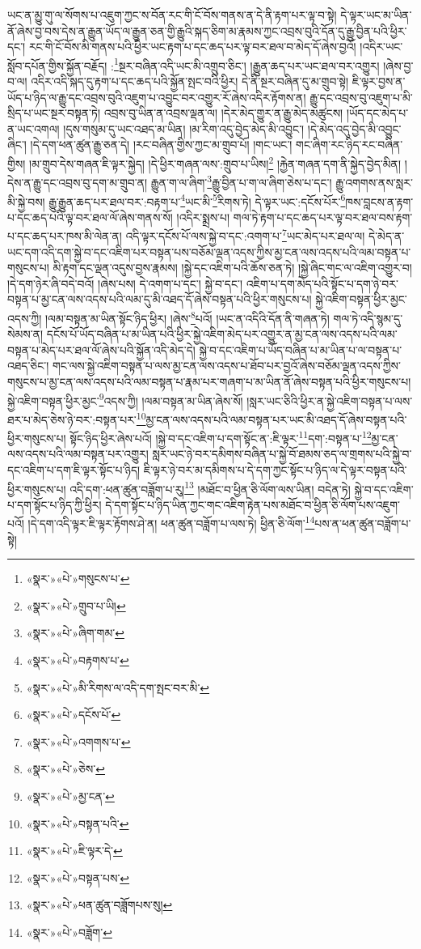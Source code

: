 ཡང་ན་མྱུ་གུ་ལ་སོགས་པ་འཇུག་ཀྱང་ས་བོན་རང་གི་ངོ་བོས་གནས་ན་དེ་ནི་རྟག་པར་ལྟ་བ་སྟེ། དེ་ལྟར་ཡང་མ་ཡིན་ནོ་ཞེས་བྱ་བས་དེས་ན་རྒྱུན་ཡོད་ལ་རྒྱུན་ཅན་གྱི་རྒྱུའི་སྐད་ཅིག་མ་རྣམས་ཀྱང་འབྲས་བུའི་དོན་དུ་རྒྱུ་བྱིན་པའི་ཕྱིར་དང་། རང་གི་ངོ་བོས་མི་གནས་པའི་ཕྱིར་ཡང་རྟག་པ་དང་ཆད་པར་ལྟ་བར་ཐལ་བ་མེད་དོ་ཞེས་བྱའོ། །འདིར་ཡང་སློབ་དཔོན་གྱིས་སྐྱོན་བརྗོད། :\footnote{«སྣར་»«པེ་»གསུངས་པ་}སྔར་བཞིན་འདི་ཡང་མི་འགྲུབ་ཅིང་། །རྒྱུན་ཆད་པར་ཡང་ཐལ་བར་འགྱུར། །ཞེས་བྱ་བ་ལ། འདིར་འདི་སྐད་དུ་རྟག་པ་དང་ཆད་པའི་སྐྱོན་སྤང་བའི་ཕྱིར། དེ་ནི་སྔར་བཞིན་དུ་མ་གྲུབ་སྟེ། ཇི་ལྟར་བྱས་ན་ཡོད་པ་ཉིད་ལ་རྒྱུ་དང་འབྲས་བུའི་འཇུག་པ་འབྱུང་བར་འགྱུར་རོ་ཞེས་འདིར་རྟོགས་ན། རྒྱུ་དང་འབྲས་བུ་འཇུག་པ་མི་སྲིད་པ་ཡང་སྔར་བསྟན་ཏེ། འབྲས་བུ་ཡིན་ན་འབྲས་ལྡན་ལ། །དེར་མེད་གྱུར་ན་རྒྱུ་མེད་མཚུངས། །ཡོད་དང་མེད་པ་ན་ཡང་འགལ། །དུས་གསུམ་དུ་ཡང་འཐད་མ་ཡིན། །མ་རིག་འདུ་བྱེད་མེད་མི་འབྱུང་། །དེ་མེད་འདུ་བྱེད་མི་འབྱུང་ཞིང་། །དེ་དག་ཕན་ཚུན་རྒྱུ་ཅན་དེ། །རང་བཞིན་གྱིས་ཀྱང་མ་གྲུབ་པོ། །གང་ཡང་། གང་ཞིག་རང་ཉིད་རང་བཞིན་གྱིས། །མ་གྲུབ་དེས་གཞན་ཇི་ལྟར་སྐྱེད། །དེ་ཕྱིར་གཞན་ལས་:གྲུབ་པ་ཡིས།\footnote{«སྣར་»«པེ་»གྲུབ་པ་ཡི།} །རྐྱེན་གཞན་དག་ནི་སྐྱེད་བྱེད་མིན། །དེས་ན་རྒྱུ་དང་འབྲས་བུ་དག་མ་གྲུབ་ན། རྒྱུན་ག་ལ་ཞིག་\footnote{«སྣར་»«པེ་»ཞིག་གམ་}རྒྱུ་བྱིན་པ་ག་ལ་ཞིག་ཅེས་པ་དང་། རྒྱུ་འགགས་ནས་སླར་མི་སྐྱེ་བས། རྒྱུ་རྒྱུན་ཆད་པར་ཐལ་བར་:བརྟག་པ་\footnote{«སྣར་»«པེ་»བརྟགས་པ་}ཡང་མི་\footnote{«སྣར་»«པེ་»མི་རིགས་ལ་འདི་དག་སྤང་བར་མི་}རིགས་ཏེ། དེ་ལྟར་ཡང་:དངོས་པོར་\footnote{«སྣར་»«པེ་»དངོས་པོ་}ཁས་བླངས་ན་རྟག་པ་དང་ཆད་པའི་ལྟ་བར་ཐལ་ལོ་ཞེས་གནས་སོ། །འདིར་སྨྲས་པ། གལ་ཏེ་རྟག་པ་དང་ཆད་པར་ལྟ་བར་ཐལ་བས་རྟག་པ་དང་ཆད་པར་ཁས་མི་ལེན་ན། འདི་ལྟར་དངོས་པོ་ལས་སྐྱེ་བ་དང་:འགག་པ་\footnote{«སྣར་»«པེ་»འགགས་པ་}ཡང་མེད་པར་ཐལ་ལ། དེ་མེད་ན་ཡང་དག་འདི་དག་སྐྱེ་བ་དང་འཇིག་པར་བསྟན་པས་བཅོམ་ལྡན་འདས་ཀྱིས་མྱ་ངན་ལས་འདས་པའི་ལམ་བསྟན་པ་གསུངས་པ། མི་རྟག་དང་ལྡན་འདུས་བྱས་རྣམས། །སྐྱེ་དང་འཇིག་པའི་ཆོས་ཅན་ཏེ། །སྐྱེ་ཞིང་གང་ལ་འཇིག་འགྱུར་བ། །དེ་དག་ཉེར་ཞི་བདེ་བའོ། །ཞེས་པས། དེ་འགག་པ་དང་། སྐྱེ་བ་དང་། འཇིག་པ་དག་མེད་པའི་སྟོང་པ་དག་ཉེ་བར་བསྟན་པ་མྱ་ངན་ལས་འདས་པའི་ལམ་དུ་མི་འཐད་དོ་ཞེས་བསྟན་པའི་ཕྱིར་གསུངས་པ། སྐྱེ་འཇིག་བསྟན་ཕྱིར་མྱང་འདས་ཀྱི། །ལམ་བསྟན་མ་ཡིན་སྟོང་ཉིད་ཕྱིར། །ཞེས་\footnote{«སྣར་»«པེ་»ཅེས་}པའོ། །ཡང་ན་འདིའི་དོན་ནི་གཞན་ཏེ། གལ་ཏེ་འདི་སྙམ་དུ་སེམས་ན། དངོས་པོ་ཡོད་བཞིན་པ་མ་ཡིན་པའི་ཕྱིར་སྐྱེ་འཇིག་མེད་པར་འགྱུར་ན་མྱ་ངན་ལས་འདས་པའི་ལམ་བསྟན་པ་མེད་པར་ཐལ་ལོ་ཞེས་པའི་སྐྱོན་འདི་མེད་དེ། སྐྱེ་བ་དང་འཇིག་པ་ཡོད་བཞིན་པ་མ་ཡིན་པ་ལ་བསྟན་པ་འཐད་ཅིང་། གང་ལས་སྐྱེ་འཇིག་བསྟན་པ་ལས་མྱ་ངན་ལས་འདས་པ་ཐོབ་པར་བྱའོ་ཞེས་བཅོམ་ལྡན་འདས་ཀྱིས་གསུངས་པ་མྱ་ངན་ལས་འདས་པའི་ལམ་བསྟན་པ་རྣམ་པར་གཞག་པ་མ་ཡིན་ནོ་ཞེས་བསྟན་པའི་ཕྱིར་གསུངས་པ། སྐྱེ་འཇིག་བསྟན་ཕྱིར་མྱང་\footnote{«སྣར་»«པེ་»མྱ་ངན་}འདས་ཀྱི། །ལམ་བསྟན་མ་ཡིན་ཞེས་སོ། །སླར་ཡང་ཅིའི་ཕྱིར་ན་སྐྱེ་འཇིག་བསྟན་པ་ལས་ཐར་པ་མེད་ཅེས་ཉེ་བར་:བསྟན་པར་\footnote{«སྣར་»«པེ་»བསྟན་པའི་}མྱ་ངན་ལས་འདས་པའི་ལམ་བསྟན་པར་ཡང་མི་འཐད་དོ་ཞེས་བསྟན་པའི་ཕྱིར་གསུངས་པ། སྟོང་ཉིད་ཕྱིར་ཞེས་པའོ། །སྐྱེ་བ་དང་འཇིག་པ་དག་སྟོང་ན་:ཇི་ལྟར་\footnote{«སྣར་»«པེ་»ཇི་ལྟར་དེ་}དག་:བསྟན་པ་\footnote{«སྣར་»«པེ་»བསྟན་པས་}མྱ་ངན་ལས་འདས་པའི་ལམ་བསྟན་པར་འགྱུར། སླར་ཡང་ཉེ་བར་དམིགས་བཞིན་པ་སྐྱེ་བོ་ཐམས་ཅད་ལ་གྲགས་པའི་སྐྱེ་བ་དང་འཇིག་པ་དག་ཇི་ལྟར་སྟོང་པ་ཉིད། ཇི་ལྟར་ཉེ་བར་མ་དམིགས་པ་དེ་དག་ཀྱང་སྟོང་པ་ཉིད་ལ་དེ་ལྟར་བསྟན་པའི་ཕྱིར་གསུངས་པ། འདི་དག་:ཕན་ཚུན་བཟློག་པ་རུ།\footnote{«སྣར་»«པེ་»ཕན་ཚུན་བཟློགཔས་སུ།} །མཐོང་བ་ཕྱིན་ཅི་ལོག་ལས་ཡིན། བདེན་ཏེ། སྐྱེ་བ་དང་འཇིག་པ་དག་སྟོང་པ་ཉིད་ཀྱི་ཕྱིར། དེ་དག་སྟོང་པ་ཉིད་ཡིན་ཀྱང་གང་འཇིག་རྟེན་པས་མཐོང་བ་ཕྱིན་ཅི་ལོག་པས་འཇུག་པའོ། །དེ་དག་འདི་ལྟར་ཇི་ལྟར་རྟོགས་ཤེ་ན། ཕན་ཚུན་བཟློག་པ་ལས་ཏེ། ཕྱིན་ཅི་ལོག་\footnote{«སྣར་»«པེ་»བཟློག་}པས་ན་ཕན་ཚུན་བཟློག་པ་སྟེ། 